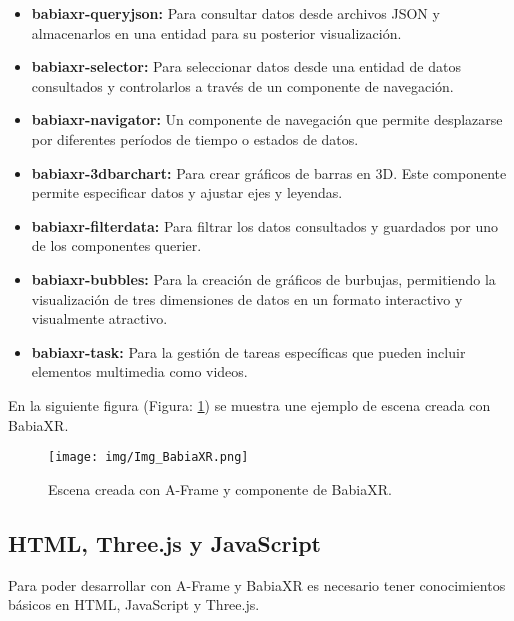 \documentclass[a4paper, 12pt]{book}
\begin{document}
        \begin{itemize}
            \item \textbf{babiaxr-queryjson:} Para consultar datos desde archivos JSON y almacenarlos en una entidad para su posterior visualización.
        
            \item \textbf{babiaxr-selector:} Para seleccionar datos desde una entidad de datos consultados y controlarlos a través de un componente de navegación.
        
            \item \textbf{babiaxr-navigator:} Un componente de navegación que permite desplazarse por diferentes períodos de tiempo o estados de datos.
        
            \item \textbf{babiaxr-3dbarchart:} Para crear gráficos de barras en 3D. Este componente permite especificar datos y ajustar ejes y leyendas.
        
            \item \textbf{babiaxr-filterdata:} Para filtrar los datos consultados y guardados por uno de los componentes querier.
        
            \item \textbf{babiaxr-bubbles:} Para la creación de gráficos de burbujas, permitiendo la visualización de tres dimensiones de datos en un formato interactivo y visualmente atractivo.
        
            \item \textbf{babiaxr-task:} Para la gestión de tareas específicas que pueden incluir elementos multimedia como videos.
            
        \end{itemize}


                En la siguiente figura (Figura: \ref{fig:Img_Ejemplo_Aframe}) se muestra une ejemplo de escena creada con BabiaXR.

        \begin{figure}[H]
            \centering
            \texttt{[image: img/Img\_BabiaXR.png]}
            \caption{Escena creada con A-Frame y componente de BabiaXR.}
            \label{fig:Img_Ejemplo_Aframe}
        \end{figure}

        
    \subsection{HTML, Three.js y JavaScript}
    Para poder desarrollar con A-Frame y BabiaXR es necesario tener conocimientos básicos en HTML, JavaScript y Three.js. 
    
\end{document}

